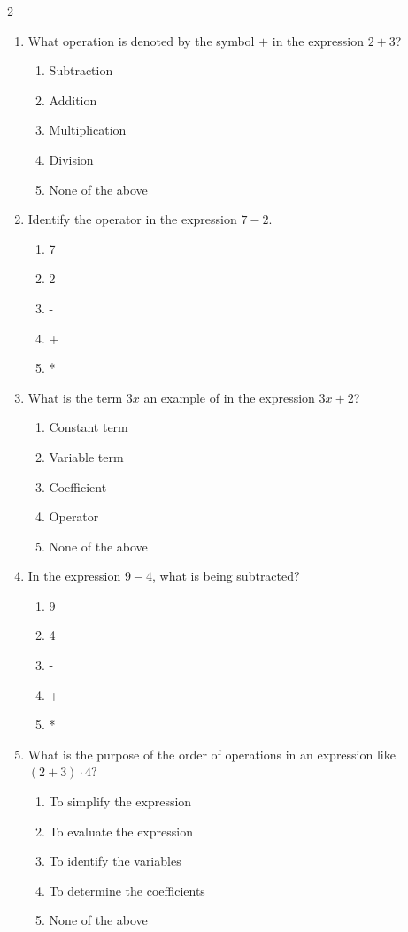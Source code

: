 \documentclass[10pt]{article}
\begin{document}
\begin{multicols}{2}
\begin{enumerate}[label=\textbf{Q\arabic*.}, leftmargin=*, itemsep=6pt, parsep=0pt]
  \item \small What operation is denoted by the symbol $+$ in the expression $2 + 3$?
  \begin{enumerate}[label=(\Alph*), leftmargin=0.6cm, nosep, itemsep=2pt]
    \item Subtraction
    \item Addition
    \item Multiplication
    \item Division
    \item None of the above
  \end{enumerate}

  \item \small Identify the operator in the expression $7 - 2$.
  \begin{enumerate}[label=(\Alph*), leftmargin=0.6cm, nosep, itemsep=2pt]
    \item 7
    \item 2
    \item -
    \item +
    \item *
  \end{enumerate}

  \item \small What is the term $3x$ an example of in the expression $3x + 2$?
  \begin{enumerate}[label=(\Alph*), leftmargin=0.6cm, nosep, itemsep=2pt]
    \item Constant term
    \item Variable term
    \item Coefficient
    \item Operator
    \item None of the above
  \end{enumerate}

  \item \small In the expression $9 - 4$, what is being subtracted?
  \begin{enumerate}[label=(\Alph*), leftmargin=0.6cm, nosep, itemsep=2pt]
    \item 9
    \item 4
    \item -
    \item +
    \item *
  \end{enumerate}

  \item \small What is the purpose of the order of operations in an expression like $(2 + 3) \cdot 4$?
  \begin{enumerate}[label=(\Alph*), leftmargin=0.6cm, nosep, itemsep=2pt]
    \item To simplify the expression
    \item To evaluate the expression
    \item To identify the variables
    \item To determine the coefficients
    \item None of the above
  \end{enumerate}


\end{enumerate}
\end{multicols}
\end{document}
